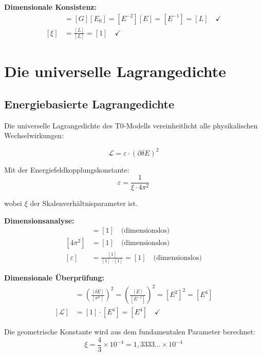 \documentclass[12pt,a4paper]{report}
\newcommand{\rzero}{r_0}                  %
\begin{document}
	\textbf{Dimensionale Konsistenz:}
	\begin{align}
		[\rzero] &= [G][E_0] = [E^{-2}][E] = [E^{-1}] = [L] \quad \checkmark \\
		[\xi] &= \frac{[L]}{[L]} = [1] \quad \checkmark
	\end{align}
	
	\section{Die universelle Lagrangedichte}
	\label{sec:universal_lagrangian}
	
\subsection{Energiebasierte Lagrangedichte}
\label{subsec:energy_based_lagrangian}

Die universelle Lagrangedichte des T0-Modells vereinheitlicht alle physikalischen Wechselwirkungen:

\begin{equation}
	\boxed{\mathcal{L} = \varepsilon \cdot (\partial \delta E)^2}
	\label{eq:universal_lagrangian_density}
\end{equation}

Mit der Energiefeldkopplungskonstante:
\begin{equation}
	\varepsilon = \frac{1}{\xi \cdot 4\pi^2}
\end{equation}

wobei $\xi$ der Skalenverhältnisparameter ist.

\textbf{Dimensionsanalyse:}
\begin{align}
	[\xi] &= [1] \quad \text{(dimensionslos)} \\
	[4\pi^2] &= [1] \quad \text{(dimensionslos)} \\
	[\varepsilon] &= \frac{[1]}{[1] \cdot [1]} = [1] \quad \text{(dimensionslos)}
\end{align}

\textbf{Dimensionale Überprüfung:}
\begin{align}
	[(\partial \delta E)^2] &= \left(\frac{[\delta E]}{[x^\mu]}\right)^2 = \left(\frac{[E]}{[E^{-1}]}\right)^2 = [E^2]^2 = [E^4] \\
	[\mathcal{L}] &= [1] \cdot [E^4] = [E^4] \quad \checkmark
\end{align}

Die geometrische Konstante wird aus dem fundamentalen Parameter berechnet:
\begin{equation}
	\xi = \frac{4}{3} \times 10^{-4} = 1,3333... \times 10^{-4}
\end{equation}
\end{document}
